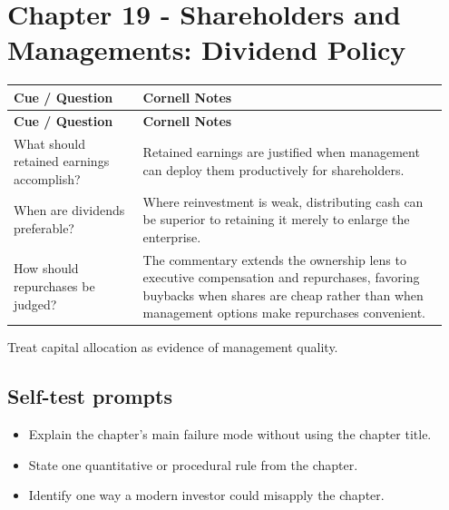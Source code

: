 \documentclass[11pt]{article}
\begin{document}
\section{Chapter 19 - Shareholders and Managements: Dividend Policy}
\begin{longtable}{@{}>{\raggedright\arraybackslash}p{0.29\linewidth}>{\raggedright\arraybackslash}p{0.66\linewidth}@{}}\toprule\textbf{Cue / Question} & \textbf{Cornell Notes}\\\midrule\endfirsthead\toprule\textbf{Cue / Question} & \textbf{Cornell Notes}\\\midrule\endhead
What should retained earnings accomplish? & Retained earnings are justified when management can deploy them productively for shareholders. \\
When are dividends preferable? & Where reinvestment is weak, distributing cash can be superior to retaining it merely to enlarge the enterprise. \\
How should repurchases be judged? & The commentary extends the ownership lens to executive compensation and repurchases, favoring buybacks when shares are cheap rather than when management options make repurchases convenient. \\
\bottomrule\end{longtable}
\begin{principlebox}Treat capital allocation as evidence of management quality.\end{principlebox}
\subsection*{Self-test prompts}\begin{itemize}\item Explain the chapter's main failure mode without using the chapter title.\item State one quantitative or procedural rule from the chapter.\item Identify one way a modern investor could misapply the chapter.\end{itemize}
\end{document}
